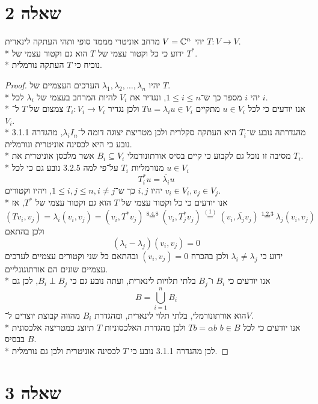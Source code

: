 \section{שאלה 2}
יהי $V = \mathbb{C}^n$ מרחב אוניטרי מממד סופי ותהי העתקה לינארית $T : V \to V$. \\*
ידוע כי כל וקטור עצמי של $T$ הוא גם וקטור עצמי של $T^*$. \\*
נוכיח כי $T$ העתקה נורמלית.
\begin{proof}
	יהיו $\lambda_1, \lambda_2, \hdots, \lambda_n$ הערכים העצמיים של $T$. \\*
	יהי $i$ מספר כך ש־$1 \le i \le n$, ונגדיר את $V_i$ להיות המרחב בעצמי של $\lambda_i$ לכל $i$. \\*
	אנו יודעים כי לכל $u \in V_i$ מתקיים $T u = \lambda_i u \in V_i$ ולכן נגדיר $T_i : V_i \to V_i$ צמצום של $T$ ל־$V_i$. \\*
	מהגדרתה נובע ש־$T_i$ היא העתקה סקלרית ולכן מטריצת יצוגה דומה ל־$\lambda_i I_n$, מהגדרה 3.1.1 נובע כי היא לכסינה אוניטרית ונורמלית. \\*
	מסיבה זו נוכל גם לקבוע כי קיים בסיס אורתונורמלי $B_i \subseteq V_i$ אשר מלכסן אוניטרית את $T_i$. \\*
	מנורמליות $T_i$ על־פי למה 3.2.5 נובע גם כי לכל $u \in V_i$
	\[
		T_i^* u = \overline{\lambda_i} u \tag{1}
	\]
	יהיו $i, j$ כך ש־$1 \le i, j \le n, i \ne j$, ויהיו וקטורים $v_i \in V_i, v_j \in V_j$. \\*
	אנו יודעים כי כל וקטור עצמי של $T$ הוא גם וקטור עצמי של $T^*$, אז
	\[
		(T v_i, v_j)
		= \lambda_i (v_i, v_j) = (v_i, T^* v_j)
		\overset{\text{8.4.8}}{=} (v_i, T_j^* v_j)
		\overset{(1)}{=} (v_i, \overline{\lambda_j} v_j)
		\overset{\text{1.2.3}}{=} \lambda_j (v_i, v_j)
	\]
	ולכן בהתאם
	\[
		(\lambda_i - \lambda_j) (v_i, v_j) = 0
	\]
	ידוע כי $\lambda_i \ne \lambda_j$ ולכן בהכרח $(v_i, v_j) = 0$ ובהתאם כל שני וקטורים עצמיים לערכים עצמיים שונים הם אורתוגונליים. \\*
	אנו יודעים כי $B_i$ ו־$B_j$ בלתי תלויות לינארית, ועתה נובע גם כי $B_i \perp B_j$, לכן גם
	\[
		B = \bigcup_{i = 1}^n B_i
	\]
	הוא אורתונורמלי, בלתי תלוי לינארית, ומהגדרת $B_i$ מהווה קבוצת יוצרים ל־$V$. \\*
	אנו יודעים כי לכל $b \in B$ $T b = \alpha b$ ולכן מהגדרת האלכסוניות $T$ תיוצג כמטריצה אלכסונית בבסיס $B$. \\*
	לכן מהגדרה 3.1.1 נובע כי $T$ לכסינה אוניטרית ולכן גם נורמלית.
\end{proof}

\section{שאלה 3}
